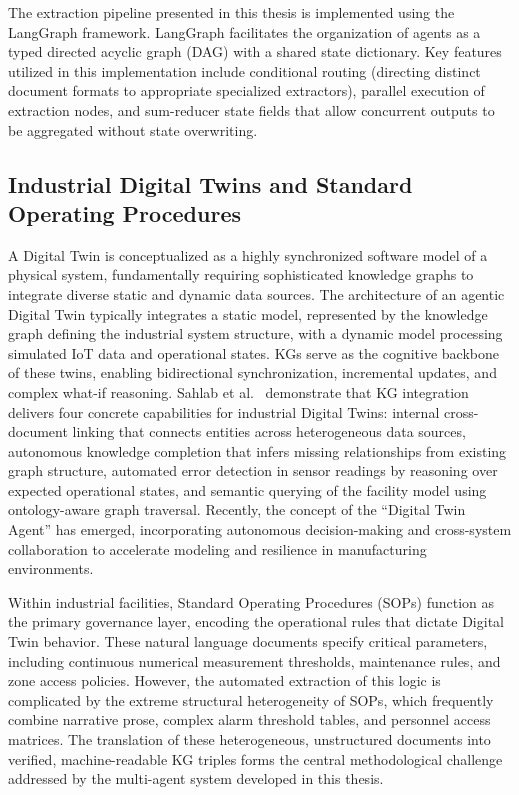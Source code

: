 ﻿\documentclass[11pt]{article}
\begin{document}
The extraction pipeline presented in this thesis is implemented using the LangGraph framework. LangGraph facilitates the organization of agents as a typed directed acyclic graph (DAG) with a shared state dictionary. Key features utilized in this implementation include conditional routing (directing distinct document formats to appropriate specialized extractors), parallel execution of extraction nodes, and sum-reducer state fields that allow concurrent outputs to be aggregated without state overwriting.

\subsection{Industrial Digital Twins and Standard Operating Procedures}
\label{sec:bg_dt}

A Digital Twin is conceptualized as a highly synchronized software model of a physical system, fundamentally requiring sophisticated knowledge graphs to integrate diverse static and dynamic data sources. The architecture of an agentic Digital Twin typically integrates a static model, represented by the knowledge graph defining the industrial system structure, with a dynamic model processing simulated IoT data and operational states. KGs serve as the cognitive backbone of these twins, enabling bidirectional synchronization, incremental updates, and complex what-if reasoning. Sahlab et al.~\cite{sahlab2021kg} demonstrate that KG integration delivers four concrete capabilities for industrial Digital Twins: internal cross-document linking that connects entities across heterogeneous data sources, autonomous knowledge completion that infers missing relationships from existing graph structure, automated error detection in sensor readings by reasoning over expected operational states, and semantic querying of the facility model using ontology-aware graph traversal. Recently, the concept of the ``Digital Twin Agent'' has emerged, incorporating autonomous decision-making and cross-system collaboration to accelerate modeling and resilience in manufacturing environments.

Within industrial facilities, Standard Operating Procedures (SOPs) function as the primary governance layer, encoding the operational rules that dictate Digital Twin behavior. These natural language documents specify critical parameters, including continuous numerical measurement thresholds, maintenance rules, and zone access policies. However, the automated extraction of this logic is complicated by the extreme structural heterogeneity of SOPs, which frequently combine narrative prose, complex alarm threshold tables, and personnel access matrices. The translation of these heterogeneous, unstructured documents into verified, machine-readable KG triples forms the central methodological challenge addressed by the multi-agent system developed in this thesis.
\end{document}
